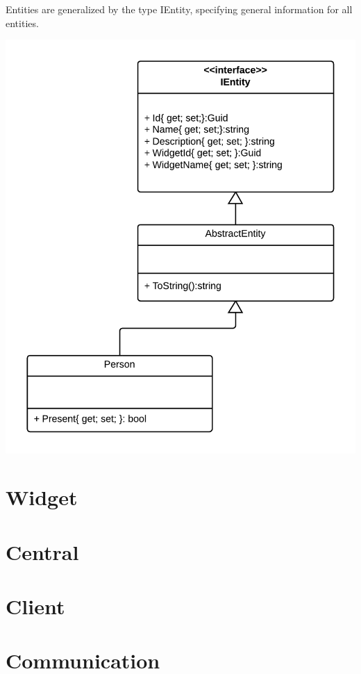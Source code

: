 \documentclass[]{report}
\begin{document}
Entities are generalized by the type IEntity, specifying general information for all entities.


\begin{center}
\includegraphics[scale=0.15]{ContextClassDiagram.png}
\end{center}


\section{Widget}

\section{Central}

\section{Client}

\section{Communication}
\end{document}
